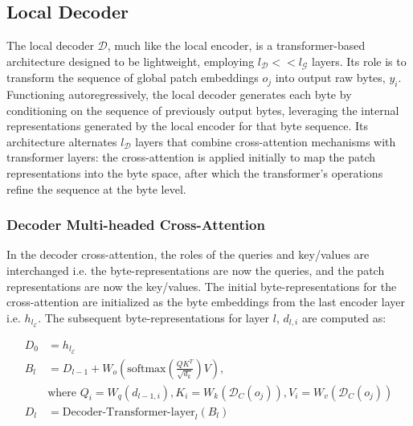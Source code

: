 \subsection{Local Decoder} 

The local decoder $\mathcal{D}$, much like the local encoder, is a transformer-based architecture designed to be lightweight, employing $l_{\mathcal{D}} << l_{\mathcal{G}}$ layers. Its role is to transform the sequence of global patch embeddings $o_j$ into output raw bytes, $y_i$. Functioning autoregressively, the local decoder generates each byte by conditioning on the sequence of previously output bytes, leveraging the internal representations generated by the local encoder for that byte sequence. Its architecture alternates $l_{\mathcal{D}}$ layers that combine cross-attention mechanisms with transformer layers: the cross-attention is applied initially to map the patch representations into the byte space, after which the transformer's operations refine the sequence at the byte level.

\subsubsection{Decoder Multi-headed Cross-Attention} 

In the decoder cross-attention, the roles of the queries and key/values are interchanged i.e. the byte-representations are now the queries, and the patch representations are now the key/values. The initial byte-representations for the cross-attention are initialized as the byte embeddings from the last encoder layer i.e. $h_{l_{\mathcal{E}}}$. The subsequent byte-representations for layer $l$, $d_{l,i}$ are computed as:

\begin{align}
D_0 &= h_{l_{\mathcal{E}}} \\
B_l &= D_{l-1} + W_o\left(\text{softmax}\left(\frac{QK^T}{\sqrt{d_k}}\right)V\right), \\
  &\text{where } Q_i = W_q(d_{l-1,i}), K_i = W_k(\mathcal{D}_C(o_j)), V_i = W_v(\mathcal{D}_C(o_j)) \\
  D_l &= \text{Decoder-Transformer-layer}_l(B_l)
\end{align}

